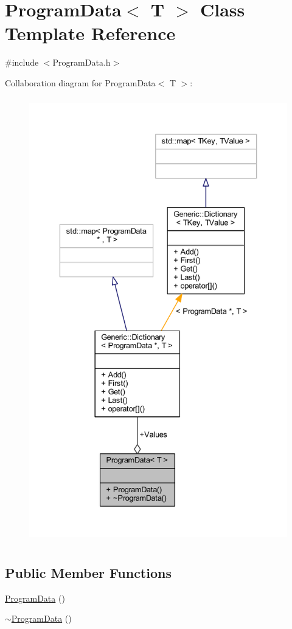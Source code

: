 \hypertarget{classProgramData}{}\section{Program\+Data$<$ T $>$ Class Template Reference}
\label{classProgramData}


{\ttfamily \#include $<$Program\+Data.\+h$>$}



Collaboration diagram for Program\+Data$<$ T $>$\+:
\nopagebreak
\begin{figure}[H]
\begin{center}
\leavevmode
\includegraphics[height=550pt]{classProgramData__coll__graph}
\end{center}
\end{figure}
\subsection*{Public Member Functions}
\begin{DoxyCompactItemize}
\item 
\mbox{\hyperlink{classProgramData_ac1c5a21a44f037b1c5448378fdbaabd0}{Program\+Data}} ()
\item 
\mbox{\hyperlink{classProgramData_a04be8ca855f8898c4ca8297518c70f23}{$\sim$\+Program\+Data}} ()
\end{DoxyCompactItemize}
